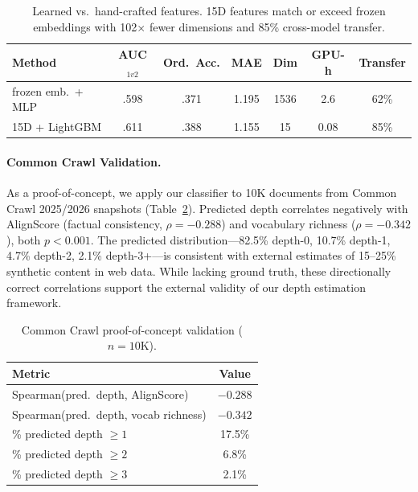 \documentclass[11pt,a4paper]{article}
\begin{document}
\begin{table}[t]
\centering
\small
\caption{Learned vs.\ hand-crafted features. 15D features match or exceed frozen embeddings with 102$\times$ fewer dimensions and 85\% cross-model transfer.}
\label{tab:learned}
\begin{tabular}{lcccccc}
\toprule
\textbf{Method} & \textbf{AUC$_{1v2}$} & \textbf{Ord.\ Acc.} & \textbf{MAE} & \textbf{Dim} & \textbf{GPU-h} & \textbf{Transfer} \\
\midrule
frozen emb.\ + MLP & .598 & .371 & 1.195 & 1536 & 2.6 & 62\% \\
15D + LightGBM & .611 & .388 & 1.155 & 15 & 0.08 & 85\% \\
\bottomrule
\end{tabular}
\end{table}

\paragraph{Common Crawl Validation.}
As a proof-of-concept, we apply our classifier to 10K documents from Common Crawl 2025/2026 snapshots (Table~\ref{tab:commoncrawl}).
Predicted depth correlates negatively with AlignScore (factual consistency, $\rho=-0.288$) and vocabulary richness ($\rho=-0.342$), both $p<0.001$.
The predicted distribution---82.5\% depth-0, 10.7\% depth-1, 4.7\% depth-2, 2.1\% depth-3+---is consistent with external estimates of 15--25\% synthetic content in web data.
While lacking ground truth, these directionally correct correlations support the external validity of our depth estimation framework.

\begin{table}[t]
\centering
\small
\caption{Common Crawl proof-of-concept validation ($n=10$K).}
\label{tab:commoncrawl}
\begin{tabular}{lc}
\toprule
\textbf{Metric} & \textbf{Value} \\
\midrule
Spearman(pred.\ depth, AlignScore) & $-0.288$ \\
Spearman(pred.\ depth, vocab richness) & $-0.342$ \\
\% predicted depth $\geq 1$ & 17.5\% \\
\% predicted depth $\geq 2$ & 6.8\% \\
\% predicted depth $\geq 3$ & 2.1\% \\
\bottomrule
\end{tabular}
\end{table}

\end{document}
